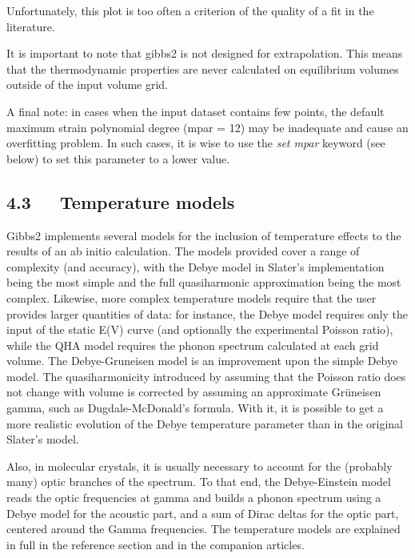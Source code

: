 \documentclass[a4paper]{article}
\begin{document}
Unfortunately, this plot is too often a criterion of the quality of a
fit in the literature.

It is important to note that gibbs2 is not designed for
extrapolation. This means that the thermodynamic properties are never
calculated on equilibrium volumes outside of the input volume grid.

A final note: in cases when the input dataset contains few points, the
default maximum strain polynomial degree (mpar = 12) may be inadequate
and cause an overfitting problem. In such cases, it is wise to use the
\emph{set mpar} keyword (see below) to set this parameter to a lower
value.


\subsection{4.3~~~Temperature models%
  \label{temperature-models}%
}

Gibbs2 implements several models for the inclusion of temperature
effects to the results of an ab initio calculation. The models
provided cover a range of complexity (and accuracy), with the Debye
model in Slater's implementation being the most simple and the full
quasiharmonic approximation being the most complex. Likewise, more
complex temperature models require that the user provides larger
quantities of data: for instance, the Debye model requires only the
input of the static E(V) curve (and optionally the experimental
Poisson ratio), while the QHA model requires the phonon spectrum
calculated at each grid volume. The Debye-Gruneisen model is an
improvement upon the simple Debye model. The quasiharmonicity
introduced by assuming that the Poisson ratio does not change with
volume is corrected by assuming an approximate Grüneisen gamma, such
as Dugdale-McDonald's formula. With it, it is possible to get a more
realistic evolution of the Debye temperature parameter than in the
original Slater's model.

Also, in molecular crystals, it is usually necessary to account for
the (probably many) optic branches of the spectrum. To that end, the
Debye-Einstein model reads the optic frequencies at gamma and builds a
phonon spectrum using a Debye model for the acoustic part, and a sum
of Dirac deltas for the optic part, centered around the Gamma
frequencies. The temperature models are explained in full in the
reference section and in the companion articles.
\end{document}
